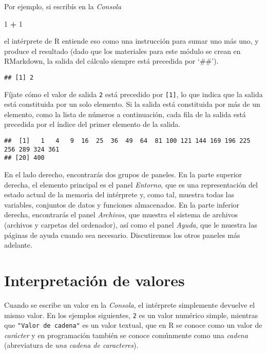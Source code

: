 \documentclass[
]{book}
\newenvironment{Shaded}{\begin{snugshade}}{\end{snugshade}}
\newcommand{\DecValTok}[1]{\textcolor[rgb]{0.00,0.00,0.81}{#1}}
\newcommand{\OperatorTok}[1]{\textcolor[rgb]{0.81,0.36,0.00}{\textbf{#1}}}
\newcommand{\StringTok}[1]{\textcolor[rgb]{0.31,0.60,0.02}{#1}}
\begin{document}
Por ejemplo, si escribís en la \emph{Consola}

\begin{Shaded}
\begin{Highlighting}[]
\DecValTok{1} \OperatorTok{+}\StringTok{ }\DecValTok{1}
\end{Highlighting}
\end{Shaded}

el intérprete de R entiende eso como una instrucción para sumar uno más uno, y produce el resultado (dado que los materiales para este módulo se crean en RMarkdown, la salida del cálculo siempre está precedida por `\#\#').

\begin{verbatim}
## [1] 2
\end{verbatim}

Fíjate cómo el valor de salida \texttt{2} está precedido por \texttt{{[}1{]}}, lo que indica que la salida está constituida por un solo elemento. Si la salida está constituida por más de un elemento, como la lista de números a continuación, cada fila de la salida está precedida por el índice del primer elemento de la salida.

\begin{verbatim}
##  [1]   1   4   9  16  25  36  49  64  81 100 121 144 169 196 225 256 289 324 361
## [20] 400
\end{verbatim}

En el lado derecho, encontrarás dos grupos de paneles. En la parte superior derecha, el elemento principal es el panel \emph{Entorno}, que es una representación del estado actual de la memoria del intérprete y, como tal, muestra todas las variables, conjuntos de datos y funciones almacenados. En la parte inferior derecha, encontrarás el panel \emph{Archivos}, que muestra el sistema de archivos (archivos y carpetas del ordenador), así como el panel \emph{Ayuda}, que le muestra las páginas de ayuda cuando sea necesario. Discutiremos los otros paneles más adelante.

\hypertarget{interpretaciuxf3n-de-valores}{%
\section{Interpretación de valores}\label{interpretaciuxf3n-de-valores}}

Cuando se escribe un valor en la \emph{Consola}, el intérprete simplemente devuelve el mismo valor. En los ejemplos siguientes, \texttt{2} es un valor numérico simple, mientras que \texttt{"Valor\ de\ cadena"} es un valor textual, que en R se conoce como un valor de \emph{carácter} y en programación también se conoce comúnmente como una \emph{cadena} (abreviatura de \emph{una cadena de caracteres}).
\end{document}

